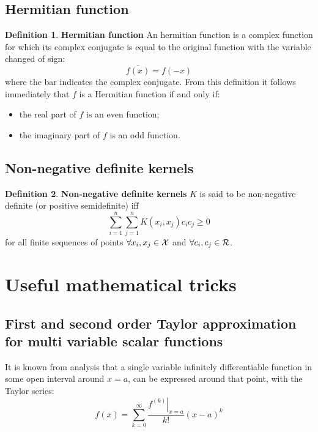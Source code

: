 \documentclass[12pt, letterpaper]{article}
\theoremstyle{definition}
\newtheorem{definition}{Definition}[section]
\let\tb\textbf
\begin{document}
\subsection{Hermitian function}
\begin{definition}{\tb{Hermitian function}}
\label{Hermitian}
An hermitian function is a complex function for which its complex conjugate is equal to the original function with the variable changed of sign:
\begin{equation}
\bar{f(x)} = f(-x)
\end{equation}
where the bar indicates the complex conjugate.
From this definition it follows immediately that $f$ is a Hermitian function if and only if:
\begin{itemize}
\item the real part of $f$ is an even function;
\item the imaginary part of $f$ is an odd function.
\end{itemize}
\end{definition}

\subsection{Non-negative definite kernels}
\begin{definition}{\tb{Non-negative definite kernels}}
$K$ is said to be non-negative definite (or positive semidefinite) iff
\begin{equation}
\sum _{i=1}^{n}\sum _{j=1}^{n}K(x_{i},x_{j})c_{i}c_{j}\geq 0
\end{equation}
for all finite sequences of points $\forall x_i,x_j \in \CMcal{X}$ and $\forall c_i, c_j \in \CMcal{R}$.
\end{definition}

\newpage
\section{Useful mathematical tricks}
\subsection{First and second order Taylor approximation for multi variable scalar functions}
\label{subsec:Taylor}
It is known from analysis that a single variable  infinitely differentiable function in some open interval around $x=a$, can be expressed around that point, with the Taylor series:
\begin{equation}
f(x) = \displaystyle \sum_{k=0}^\infty \frac{\left. f^{(k)}\right|_{x=a} }{k!} (x-a)^k
\end{equation}
\end{document}
